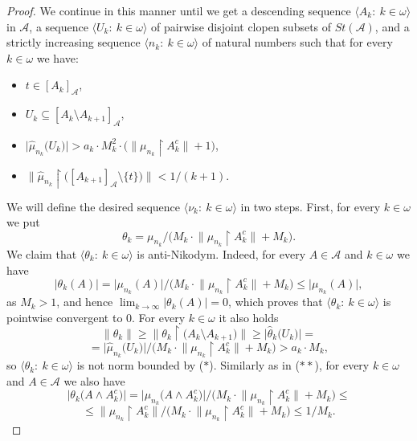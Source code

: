 \documentclass[a4paper,11pt,fleqn]{amsart}
\theoremstyle{definition}
\theoremstyle{remark}
\numberwithin{equation}{section}
\newcommand{\N}{\mathbb{N}}
\newcommand{\aA}{\mathcal{A}}
\newcommand{\rstr}{\restriction}
\newcommand{\sm}{\setminus}
\newcommand{\sub}{\subseteq}
\newcommand{\wh}{\widehat}
\newcommand{\seqk}[1]{\big\langle#1\colon\ k\io\big\rangle}
\newcommand{\clopen}[1]{\left[#1\right]}
\newcommand{\iA}{\in\aA}
\newcommand{\io}{\in\omega}%
\begin{document}
\begin{proof}
We continue in this manner until we get a descending sequence $\seqk{A_k}$ in $\aA$, a sequence $\seqk{U_k}$ of pairwise disjoint clopen subsets of $St(\aA)$, and a strictly increasing sequence $\seqk{n_k}$ of natural numbers such that for every $k\io$ we have:
\begin{itemize}
	\item $t\in\clopen{A_k}_\aA$,
	\item $U_k\sub\clopen{A_k\sm A_{k+1}}_\aA$,
	\item $\big|\wh{\mu}_{n_k}\big(U_k\big)\big|>a_k\cdot M_k^2\cdot\Big(\big\|\mu_{n_k}\rstr A_k^c\big\|+1\Big)$,
	\item $\big\|\wh{\mu}_{n_k}\rstr\big(\clopen{A_{k+1}}_\aA\sm\{t\}\big)\big\|<1/(k+1)$.
\end{itemize}

\medskip

We will define the desired sequence $\seqk{\nu_k}$ in two steps. First, for every $k\io$ we put
\[\theta_k=\mu_{n_k}\big/\big(M_k\cdot\big\|\mu_{n_k}\rstr A_k^c\big\|+M_k\big).\]
We claim that $\seqk{\theta_k}$ is anti-Nikodym. Indeed, for every $A\iA$ and $k\io$ we have
\[\big|\theta_k(A)\big|=\big|\mu_{n_k}(A)\big|\big/\big(M_k\cdot\big\|\mu_{n_k}\rstr A_k^c\big\|+M_k\big)\le\big|\mu_{n_k}(A)\big|,\]
as $M_k>1$, and hence $\lim_{k\to\infty}\big|\theta_k(A)\big|=0$,
which proves that $\seqk{\theta_k}$ is pointwise convergent to $0$. For every $k\io$ it also holds
\[\tag{$**$}\big\|\theta_k\big\|\ge\big\|\theta_k\rstr\big(A_k\sm A_{k+1}\big)\big\|\ge\big|\wh{\theta}_k\big(U_k\big)\big|=\]
\[=\big|\wh{\mu}_{n_k}\big(U_k\big)\big|\big/\big(M_k\cdot\big\|\mu_{n_k}\rstr A_k^c\big\|+M_k\big)>a_k\cdot M_k,\]
so $\seqk{\theta_k}$ is not norm bounded by ($*$). Similarly as in ($**$), for every $k\io$ and $A\in\aA$ we also have
\[\tag{$*\!*\!*$}\big|\theta_k\big(A\wedge A_k^c\big)\big|=\big|\mu_{n_k}\big(A\wedge A_k^c\big)\big|\big/\big(M_k\cdot\big\|\mu_{n_k}\rstr A_k^c\big\|+M_k\big)\le\]
\[\le\big\|\mu_{n_k}\rstr A_k^c\big\|\big/\big(M_k\cdot\big\|\mu_{n_k}\rstr A_k^c\big\|+M_k\big)\le1/M_k.\]

\medskip


\end{proof}
\end{document}
